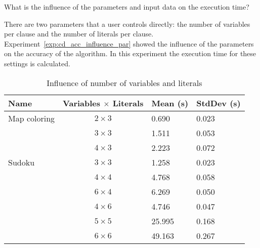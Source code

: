 \begin{question}
	What is the influence of the parameters and input data on the execution time?
\end{question}

\begin{experiment}
	There are two parameters that a user controls directly: the number of variables per clause and the number of literals per clause.
	Experiment~\ref{exp:cd_acc_influence_par} showed the influence of the parameters on the accuracy of the algorithm.
	In this experiment the execution time for these settings is calculated.

	\begin{table}[!htp]
		\begin{tabularx}{\textwidth}{lc|XX}
			\textbf{Name}	& \textbf{Variables $\times$ Literals}	& \textbf{Mean (s)}	& \textbf{StdDev (s)} \\
			\toprule
			Map coloring 	& $2 \times 3$ 			& 0.690				& 0.023	\\
							& $3 \times 3$ 			& 1.511				& 0.053	\\
							& $4 \times 3$ 			& 2.223				& 0.072	\\
			\midrule	
			Sudoku 			& $3 \times 3$ 			& 1.258				& 0.023	\\
							& $4 \times 4$ 			& 4.768				& 0.058	\\
							& $6 \times 4$ 			& 6.269				& 0.050	\\
							& $4 \times 6$ 			& 4.746				& 0.047	\\
							& $5 \times 5$ 			& 25.995			& 0.168	\\
							& $6 \times 6$ 			& 49.163			& 0.267
		\end{tabularx}
		\caption{Influence of number of variables and literals}
		\label{tbl:cd_speed_influence}
	\end{table}

\end{experiment}

